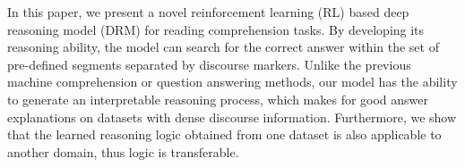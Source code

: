 In this paper, we present a novel reinforcement learning (RL) based deep reasoning model (DRM) for reading comprehension tasks. By developing its reasoning ability, the model can search for the correct answer within the set of pre-defined segments separated by discourse markers. Unlike the previous machine comprehension or question answering methods, our model has the ability to generate an interpretable reasoning process, which makes for good answer explanations on datasets with dense discourse information. Furthermore, we show that the learned reasoning logic obtained from one dataset is also applicable to another domain, thus logic is transferable. 
